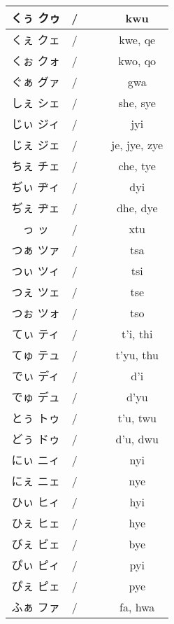 \documentclass{article}
\begin{document}
\begin{center}
\begin{japanese}
\begin{longtable}{|c|c c c|c|}
                くぅ クゥ & / &&& kwu \\ \hline
                くぇ クェ & / &&& kwe, qe \\ \hline
                くぉ クォ & / &&& kwo, qo \\ \hline
                ぐぁ グァ & / &&& gwa \\ \hline
                しぇ シェ & / &&& she, sye \\ \hline
                じぃ ジィ & / &&& jyi \\ \hline
                じぇ ジェ & / &&& je, jye, zye \\ \hline
                ちぇ チェ & / &&& che, tye \\ \hline
                ぢぃ ヂィ & / &&& dyi \\ \hline
                ぢぇ ヂェ & / &&& dhe, dye \\ \hline
                っ ッ & / &&& xtu \\ \hline
                つぁ ツァ & / &&& tsa \\ \hline
                つぃ ツィ & / &&& tsi \\ \hline
                つぇ ツェ & / &&& tse \\ \hline
                つぉ ツォ & / &&& tso \\ \hline
                てぃ ティ & / &&& t'i, thi \\ \hline
                てゅ テュ & / &&& t'yu, thu \\ \hline
                でぃ ディ & / &&& d'i \\ \hline
                でゅ デュ & / &&& d'yu \\ \hline
                とぅ トゥ & / &&& t'u, twu \\ \hline
                どぅ ドゥ & / &&& d'u, dwu \\ \hline
                にぃ ニィ & / &&& nyi \\ \hline
                にぇ ニェ & / &&& nye \\ \hline
                ひぃ ヒィ & / &&& hyi \\ \hline
                ひぇ ヒェ & / &&& hye \\ \hline
                びぇ ビェ & / &&& bye \\ \hline
                ぴぃ ピィ & / &&& pyi \\ \hline
                ぴぇ ピェ & / &&& pye \\ \hline
                ふぁ ファ & / &&& fa, hwa \\ \hline

\end{longtable}
\end{japanese}
\end{center}
\end{document}
